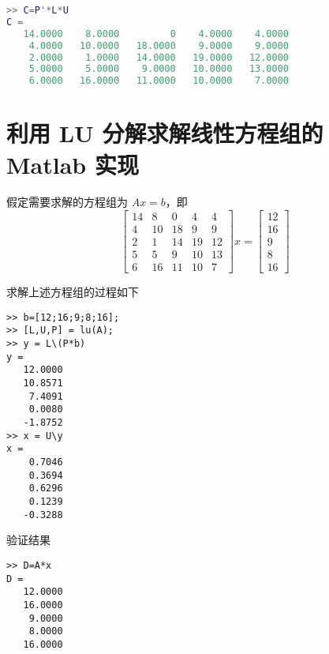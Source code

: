 \begin{lstlisting}[language=Matlab]  
>> C=P'*L*U
C =
   14.0000    8.0000         0    4.0000    4.0000
    4.0000   10.0000   18.0000    9.0000    9.0000
    2.0000    1.0000   14.0000   19.0000   12.0000
    5.0000    5.0000    9.0000   10.0000   13.0000
    6.0000   16.0000   11.0000   10.0000    7.0000
\end{lstlisting}


\section{利用 LU 分解求解线性方程组的 Matlab 实现}
假定需要求解的方程组为 $Ax=b$，即
\begin{equation}
    \begin{bmatrix}
        14 & 8  & 0  & 4  & 4  \\
        4  & 10 & 18 & 9  & 9  \\
        2  & 1  & 14 & 19 & 12 \\
        5  & 5  & 9  & 10 & 13 \\
        6  & 16 & 11 & 10 & 7
    \end{bmatrix}
    x = 
    \begin{bmatrix}
        12 \\ 16 \\ 9 \\ 8 \\ 16
    \end{bmatrix}
\end{equation}

求解上述方程组的过程如下
\begin{lstlisting}
>> b=[12;16;9;8;16];
>> [L,U,P] = lu(A);
>> y = L\(P*b)
y =
   12.0000
   10.8571
    7.4091
    0.0080
   -1.8752
>> x = U\y
x =
    0.7046
    0.3694
    0.6296
    0.1239
   -0.3288
\end{lstlisting}

验证结果
\begin{lstlisting}
>> D=A*x
D =
   12.0000
   16.0000
    9.0000
    8.0000
   16.0000
\end{lstlisting}


